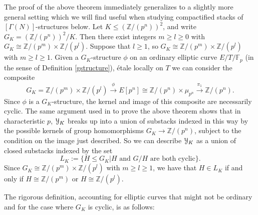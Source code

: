 \documentclass[11pt]{amsart}
\theoremstyle{definition}
\begin{document}
The proof of the above theorem immediately generalizes to a slightly more general setting which we will find useful when studying compactified stacks of $[\Gamma(N)]$-structures below. Let $K \leq (\mathbb{Z}/(p^n))^2$, and write $G_K = (\mathbb{Z}/(p^n))^2/K$. Then there exist integers $m\geq l \geq 0$ with $G_K \cong \mathbb{Z}/(p^m) \times \mathbb{Z}/(p^l)$. Suppose that $l\geq 1$, so $G_K \cong \mathbb{Z}/(p^m) \times \mathbb{Z}/(p^l)$ with $m\geq l \geq 1$. Given a $G_K$-structure $\phi$ on an ordinary elliptic curve $E/T/\mathbb{F}_p$ (in the sense of Definition \ref{gstructure}), \'etale locally on $T$ we can consider the composite 
\begin{displaymath}
G_K = \mathbb{Z}/(p^m) \times \mathbb{Z}/(p^l) \stackrel{\phi}{\rightarrow} E[p^n] \cong \mathbb{Z}/(p^n) \times \mu_{p^n} \stackrel{\pi_1}{\rightarrow} \mathbb{Z}/(p^n).
\end{displaymath}
Since $\phi$ is a $G_K$-structure, the kernel and image of this composite are necessarily cyclic. The same argument used in \cite[13.7.6]{KM1} to prove the above theorem shows that in characteristic $p$, ${\mathbf{\EuScript{Y}}}_K$ breaks up into a union of substacks indexed in this way by the possible kernels of group homomorphisms $G_K \rightarrow \mathbb{Z}/(p^n)$, subject to the condition on the image just described. So we can describe ${\mathbf{\EuScript{Y}}}_K$ as a union of closed substacks indexed by the set 
\begin{displaymath}
L_K := \{H\leq G_K|\textrm{$H$ and $G/H$ are both cyclic}\}.
\end{displaymath}
Since $G_K \cong \mathbb{Z}/(p^m) \times \mathbb{Z}/(p^l)$ with $m\geq l \geq 1$, we have that $H \in L_K$ if and only if $H \cong \mathbb{Z}/(p^m)$ or $H \cong \mathbb{Z}/(p^l)$. 

The rigorous definition, accounting for elliptic curves that might not be ordinary and for the case where $G_K$ is cyclic, is as follows:
\end{document}
